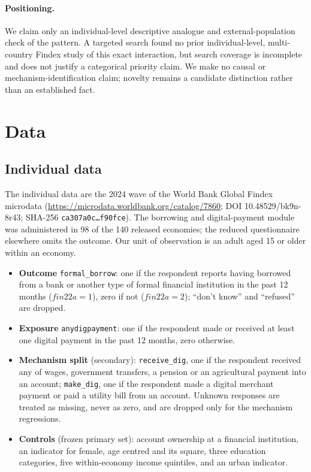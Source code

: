 \paragraph{Positioning.} We claim only an individual-level descriptive analogue and
external-population check of the \citeauthor{GalileaFaraziMare2026} pattern. A targeted
search found no prior individual-level, multi-country Findex study of this exact
interaction, but search coverage is incomplete and does not justify a categorical priority
claim. We make no causal or mechanism-identification claim; novelty remains a candidate
distinction rather than an established fact.

\section{Data}

\subsection{Individual data}

The individual data are the 2024 wave of the World Bank Global Findex microdata
(\url{https://microdata.worldbank.org/catalog/7860}; DOI 10.48529/bk9n-8r43; SHA-256
\texttt{ca307a0c\ldots f90fce}). The borrowing and digital-payment module was administered
in 98 of the 140 released economies; the reduced questionnaire elsewhere omits the outcome.
Our unit of observation is an adult aged 15 or older within an economy.

\begin{itemize}
\item \textbf{Outcome} \texttt{formal\_borrow}: one if the respondent reports having
borrowed from a bank or another type of formal financial institution in the past 12 months
($\mathit{fin22a}=1$), zero if not ($\mathit{fin22a}=2$); ``don't know'' and ``refused'' are
dropped.
\item \textbf{Exposure} \texttt{anydigpayment}: one if the respondent made or received at
least one digital payment in the past 12 months, zero otherwise.
\item \textbf{Mechanism split} (secondary): \texttt{receive\_dig}, one if the respondent
received any of wages, government transfers, a pension or an agricultural payment into an
account; \texttt{make\_dig}, one if the respondent made a digital merchant payment or paid a
utility bill from an account. Unknown responses are treated as missing, never as zero, and
are dropped only for the mechanism regressions.
\item \textbf{Controls} (frozen primary set): account ownership at a financial institution,
an indicator for female, age centred and its square, three education categories, five
within-economy income quintiles, and an urban indicator.
\end{itemize}

